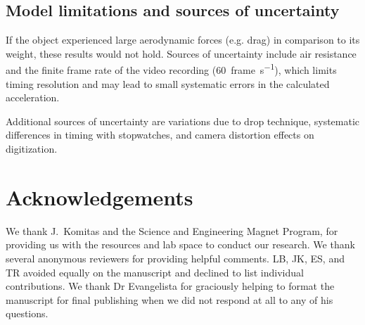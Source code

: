 \documentclass[reprint,amsmath,amssymb,aps,twoside]{revtex4-2}
\begin{document}
\subsection{Model limitations and sources of uncertainty}
If the object experienced large aerodynamic forces (e.g. drag) in comparison to its weight, these results would not hold. Sources of uncertainty include air resistance and the finite frame rate of the video recording (\qty{60}{frame\per\second}), which limits timing resolution and may lead to small systematic errors in the calculated acceleration.

Additional sources of uncertainty are variations due to drop technique, systematic differences in timing with stopwatches, and camera distortion effects on digitization. 




\section{Acknowledgements} 
We thank J.~Komitas and the Science and Engineering Magnet Program, for providing us with the resources and lab space to conduct our research. We thank several anonymous reviewers for providing helpful comments. LB, JK, ES, and TR avoided equally on the manuscript and declined to list individual contributions. We thank Dr Evangelista for graciously helping to format the manuscript for final publishing when we did not respond at all to any of his questions. 









\end{document}
